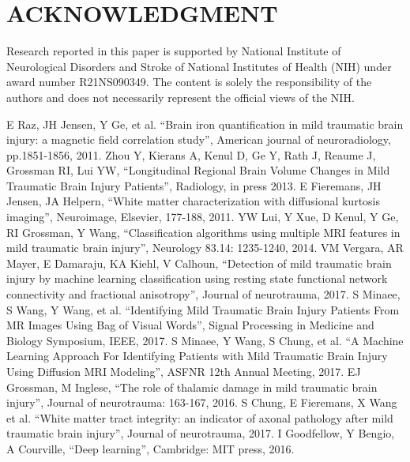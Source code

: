 \documentclass[letterpaper, 10 pt, conference]{ieeeconf}  %
\begin{document}
\section*{ACKNOWLEDGMENT}
Research reported in this paper is supported by National Institute of Neurological Disorders and Stroke of  National Institutes of Health (NIH) under award number  R21NS090349. The content is solely the responsibility of the authors and does not necessarily represent the official views of the NIH.




\begin{thebibliography}{99}
\footnotesize
{}
E Raz, JH Jensen, Y Ge,  et al. ``Brain iron quantification in mild traumatic brain injury: a magnetic field correlation study'', American journal of neuroradiology, pp.1851-1856, 2011.
Zhou Y, Kierans A, Kenul D, Ge Y, Rath J, Reaume J, Grossman RI, Lui YW, ``Longitudinal Regional Brain Volume Changes in Mild Traumatic Brain Injury Patients'', Radiology, in press 2013.
E Fieremans, JH Jensen, JA Helpern, ``White matter characterization with diffusional kurtosis imaging'', Neuroimage, Elsevier, 177-188, 2011.
YW Lui, Y Xue, D Kenul, Y Ge, RI Grossman, Y Wang, ``Classification algorithms using multiple MRI features in mild traumatic brain injury'', Neurology 83.14: 1235-1240, 2014.
VM Vergara, AR Mayer, E Damaraju, KA Kiehl, V Calhoun, ``Detection of mild traumatic brain injury by machine learning classification using resting state functional network connectivity and fractional anisotropy'', Journal of neurotrauma, 2017.
S Minaee, S Wang, Y Wang,  et al. ``Identifying Mild Traumatic Brain Injury Patients From MR Images Using Bag of Visual Words'', Signal Processing in Medicine and Biology Symposium, IEEE, 2017.
S Minaee, Y Wang, S Chung,  et al. ``A Machine Learning Approach For Identifying Patients with Mild Traumatic Brain Injury Using Diffusion MRI Modeling'', ASFNR 12th Annual Meeting, 2017.
EJ Grossman, M Inglese, ``The role of thalamic damage in mild traumatic brain injury'', Journal of neurotrauma: 163-167, 2016.
S Chung, E Fieremans, X Wang et al. ``White matter tract integrity: an indicator of axonal pathology after mild traumatic brain injury'', Journal of neurotrauma, 2017.
I Goodfellow, Y Bengio, A Courville, ``Deep learning'',  Cambridge: MIT press, 2016.







\end{thebibliography}
\end{document}
